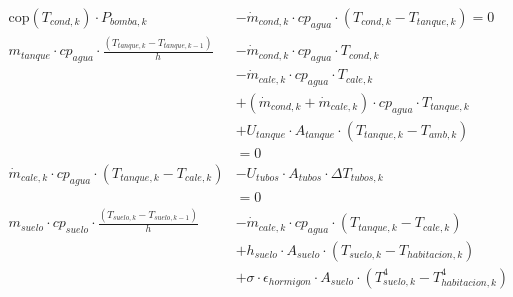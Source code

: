 \begin{align}
	\text{cop}(T_{cond,k}) \cdot P_{bomba,k}                                                    & - \dot{m}_{cond,k} \cdot cp_{agua} \cdot \left(T_{cond,k} - T_{tanque,k}\right) = 0                     \\
	m_{tanque} \cdot cp_{agua} \cdot \frac{\left(T_{tanque,k} - T_{tanque,k-1}\right)}{h}       & - \dot{m}_{cond,k} \cdot cp_{agua} \cdot T_{cond,k} \nonumber                                           \\
	                                                                                            & - \dot{m}_{cale,k} \cdot cp_{agua} \cdot T_{cale,k} \nonumber                                           \\
	                                                                                            & + (\dot{m}_{cond,k} + \dot{m}_{cale,k}) \cdot cp_{agua} \cdot T_{tanque,k} \nonumber                    \\
	                                                                                            & + U_{tanque} \cdot A_{tanque} \cdot (T_{tanque,k} - T_{amb,k}) \nonumber                                \\
	                                                                                            & = 0                                                                                                     \\
	\dot{m}_{cale,k} \cdot cp_{agua} \cdot \left(T_{tanque,k} - T_{cale,k}\right)               & - U_{tubos} \cdot A_{tubos} \cdot \Delta T_{tubos,k} \nonumber                                          \\
	                                                                                            & = 0                                                                                                     \\
	m_{suelo} \cdot cp_{suelo} \cdot \frac{\left(T_{suelo,k} - T_{suelo,k-1}\right)}{h}         & - \dot{m}_{cale,k} \cdot cp_{agua} \cdot (T_{tanque,k} - T_{cale,k}) \nonumber                          \\
	                                                                                            & + h_{suelo} \cdot A_{suelo} \cdot (T_{suelo,k} - T_{habitacion,k}) \nonumber                            \\
	                                                                                            & + \sigma \cdot \epsilon_{hormigon} \cdot A_{suelo} \cdot (T_{suelo,k}^4 - T_{habitacion,k}^4) \nonumber \\

\end{align}
